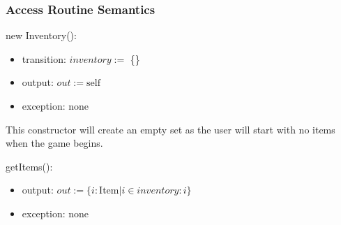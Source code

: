 \documentclass[12pt, titlepage]{article}
\begin{document}
\subsubsection{Access Routine Semantics}

\noindent new Inventory():
\begin{itemize}
\item transition: $\mathit{inventory} := $ \{\}
\item output: $out := \mbox{self}$
\item exception: none
\end{itemize}
This constructor will create an empty set as the user will start with no items when the game begins.

\noindent getItems():
\begin{itemize}
\item output: $out := \{ i: \text{Item} | i \in inventory : i \}$
\item exception: none
\end{itemize}
\end{document}
